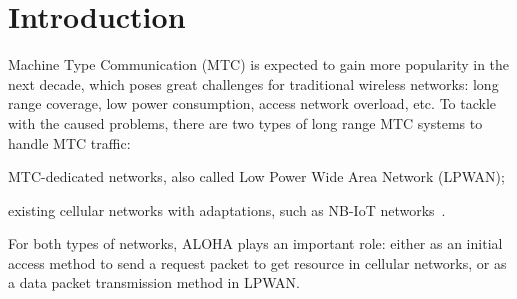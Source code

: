 \section{Introduction}
Machine Type Communication (MTC) is expected to gain more popularity in the next decade, which poses great challenges for traditional wireless networks: long range coverage,  low power consumption, access network overload, etc. To tackle with the caused problems,
there are two types of long range MTC systems to handle MTC traffic:\begin{inparaenum}[1)]
 	\item MTC-dedicated networks, also called Low Power Wide Area Network (LPWAN);
 	\item existing cellular networks with adaptations, such as NB-IoT networks~\cite{goursaud2015dedicated}\cite{song2016survey}.
 \end{inparaenum}
For both types of networks, ALOHA plays an important role: either as an initial access method to send a request packet to get resource in cellular networks, or as a data packet transmission method in LPWAN. 

